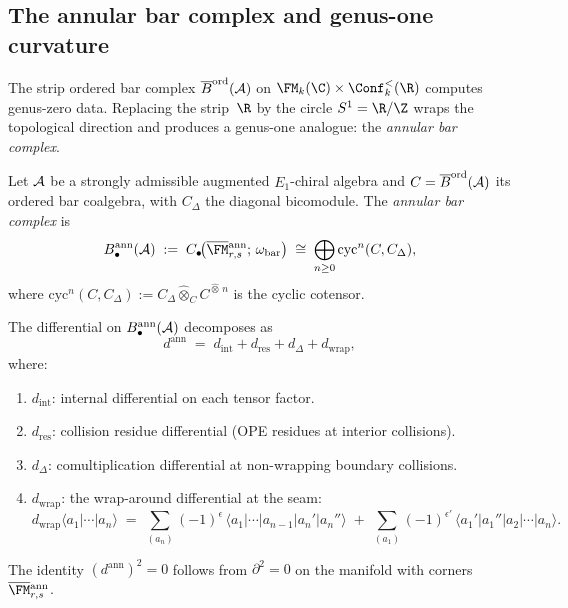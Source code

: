\subsection{The annular bar complex and genus-one curvature}

The strip ordered bar complex
$\overline{B}^{\mathrm{ord}}(\mathcal{A})$
on $\FM_k(\C)\times\Conf_k^<(\R)$ computes
genus-zero data. Replacing the strip~$\R$ by the
circle $S^1=\R/\Z$ wraps the topological direction and
produces a genus-one analogue: the
\emph{annular bar complex}.

\begin{definition}%
\label{def:annular-bar}%
Let $\mathcal{A}$ be a strongly admissible augmented $E_1$-chiral
algebra and $C=\overline{B}^{\mathrm{ord}}(\mathcal{A})$ its ordered
bar coalgebra, with $C_\Delta$ the diagonal bicomodule.
The \emph{annular bar complex} is
\[
B^{\mathrm{ann}}_\bullet(\cA)
\;:=\;
C_\bullet\!\bigl(
\overline{\FM}{}^{\mathrm{ann}}_{r,s};\,
\omega_{\mathrm{bar}}
\bigr)
\;\cong\;
\bigoplus_{n\ge 0}
\mathrm{cyc}^n(C,C_\Delta),
\]
where $\mathrm{cyc}^n(C,C_\Delta):=
C_\Delta\widehat\otimes_C C^{\widehat\otimes\,n}$ is the
cyclic cotensor.
\end{definition}

\begin{theorem}%
\label{thm:annular-bar-differential}%
The differential on $B^{\mathrm{ann}}_\bullet(\mathcal{A})$
decomposes as
\[
d^{\mathrm{ann}}
\;=\;
d_{\mathrm{int}}+d_{\mathrm{res}}
 +d_\Delta+d_{\mathrm{wrap}},
\]
where:
\begin{enumerate}[label=\textup{(\alph*)}]
\item $d_{\mathrm{int}}$: internal differential on each
 tensor factor.
\item $d_{\mathrm{res}}$: collision residue differential
 (OPE residues at interior collisions).
\item $d_\Delta$: comultiplication differential at
 non-wrapping boundary collisions.
\item $d_{\mathrm{wrap}}$: the wrap-around differential
 at the seam:
\[
d_{\mathrm{wrap}}\langle a_1|\cdots|a_n\rangle
\;=\;
\sum_{(a_n)}
(-1)^{\epsilon}\,
\langle a_1|\cdots|a_{n-1}|a_n'|a_n''\rangle
\;+\;
\sum_{(a_1)}
(-1)^{\epsilon'}\,
\langle a_1'|a_1''|a_2|\cdots|a_n\rangle.
\]
\end{enumerate}
The identity $(d^{\mathrm{ann}})^2=0$ follows from
$\partial^2=0$ on the manifold with corners
$\overline{\FM}{}^{\mathrm{ann}}_{r,s}$.
\end{theorem}

